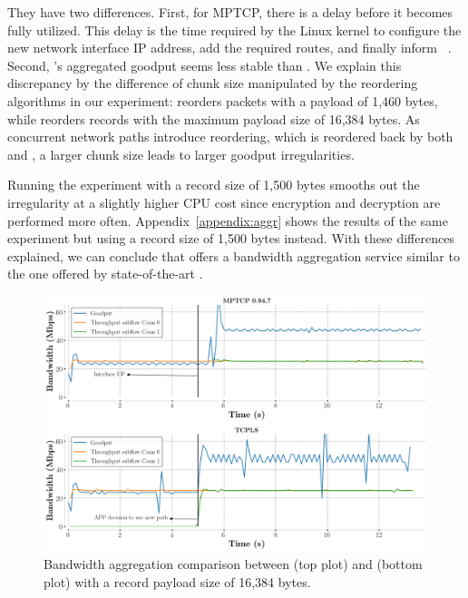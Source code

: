 They have two differences. First, for MPTCP, there is a delay before it 
becomes fully utilized. 
This delay is the time required by the Linux kernel
to configure the new network interface IP address, add the required routes, and
finally inform \mptcp~\cite{paasch2012exploring}.
Second, \tcpls's aggregated goodput seems less stable than \mptcp. We explain 
this discrepancy by the difference of chunk size manipulated by the reordering 
algorithms in our experiment: \mptcp reorders packets with a payload of 1,460 
bytes, while \tcpls reorders records with the maximum 
payload size of 16,384 bytes. As concurrent network paths introduce reordering, 
which is reordered back by both \mptcp and \tcpls, a larger chunk size 
leads to larger goodput irregularities. 

Running the experiment with a record size 
of 1,500 bytes smooths out the irregularity at a slightly higher CPU cost since 
encryption and decryption are performed more often.
Appendix~\ref{appendix:aggr} shows the results of the same experiment but using
a \tls record size of 1,500 bytes instead. With these differences explained, we 
can conclude that \tcpls offers a bandwidth aggregation service similar to the 
one offered by state-of-the-art \mptcp.


\begin{figure}[!t]
	\begin{center}
		\includegraphics[width=\columnwidth]{figures/aggregate_dual.png}
	\end{center}
	\caption{Bandwidth aggregation comparison between \mptcp (top plot) and
		\tcpls (bottom plot) with a record payload size of 16,384 bytes.}
	\label{fig:multipath_aggregation}
\end{figure}

